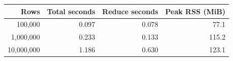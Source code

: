\begin{tabular}{@{}rrrr@{}}
\toprule Rows & Total seconds & Reduce seconds & Peak RSS (MiB)\\\midrule
100,000 & 0.097 & 0.078 & 77.1\\
1,000,000 & 0.233 & 0.133 & 115.2\\
10,000,000 & 1.186 & 0.630 & 123.1\\
\bottomrule\end{tabular}
